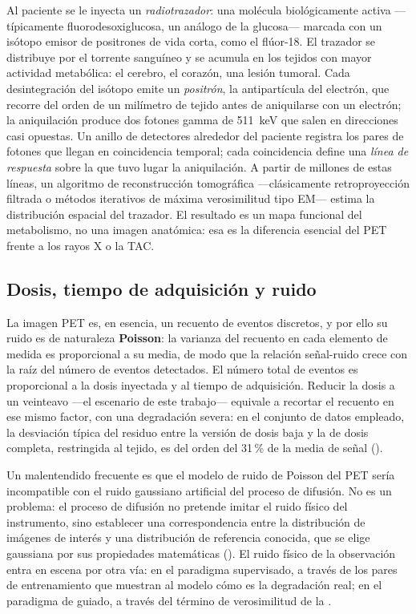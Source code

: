 Al paciente se le inyecta un \emph{radiotrazador}: una molécula
biológicamente activa —típicamente fluorodesoxiglucosa, un análogo de
la glucosa— marcada con un isótopo emisor de positrones de vida
corta, como el flúor-18. El trazador se distribuye por el torrente
sanguíneo y se acumula en los tejidos con mayor actividad metabólica:
el cerebro, el corazón, una lesión tumoral. Cada desintegración del
isótopo emite un \emph{positrón}, la antipartícula del electrón, que
recorre del orden de un milímetro de tejido antes de aniquilarse con
un electrón; la aniquilación produce dos fotones gamma de 511~keV
que salen en direcciones casi opuestas. Un anillo de detectores
alrededor del paciente registra los pares de fotones que llegan en
coincidencia temporal; cada coincidencia define una \emph{línea de
respuesta} sobre la que tuvo lugar la aniquilación. A partir de
millones de estas líneas, un algoritmo de reconstrucción tomográfica
—clásicamente retroproyección filtrada o métodos iterativos de
máxima verosimilitud tipo EM— estima la distribución espacial del
trazador. El resultado es un mapa funcional del metabolismo, no una
imagen anatómica: esa es la diferencia esencial del PET frente a los
rayos X o la TAC.

\subsection{Dosis, tiempo de adquisición y ruido}
\label{sec:pet-ruido}

La imagen PET es, en esencia, un recuento de eventos discretos, y por
ello su ruido es de naturaleza \textbf{Poisson}: la varianza del
recuento en cada elemento de medida es proporcional a su media, de
modo que la relación señal-ruido crece con la raíz del número de
eventos detectados. El número total de eventos es proporcional a la
dosis inyectada y al tiempo de adquisición. Reducir la dosis a un
veinteavo —el escenario de este trabajo— equivale a recortar el
recuento en ese mismo factor, con una degradación severa: en el
conjunto de datos empleado, la desviación típica del residuo entre la
versión de dosis baja y la de dosis completa, restringida al
tejido, es del orden del 31\,\% de la media de señal
().

Un malentendido frecuente es que el modelo de ruido de Poisson del
PET sería incompatible con el ruido gaussiano artificial del proceso
de difusión. No es un problema: el proceso de difusión no pretende
imitar el ruido físico del instrumento, sino establecer una
correspondencia entre la distribución de imágenes de interés y una
distribución de referencia conocida, que se elige gaussiana por sus
propiedades matemáticas (). El ruido físico de
la observación entra en escena por otra vía: en el paradigma
supervisado, a través de los pares de entrenamiento que muestran al
modelo cómo es la degradación real; en el paradigma de guiado, a
través del término de verosimilitud de la .

